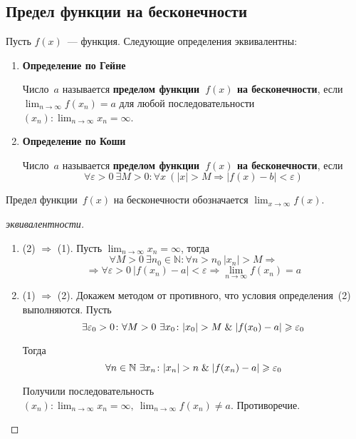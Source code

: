 \subsection{Предел функции на бесконечности}
Пусть $f(x)$~--- функция.
Следующие определения эквивалентны:
\begin{enumerate}
	\item \textbf{Определение по Гейне}
	
	Число~$a$ называется \textbf{пределом функции~$f(x)$ на бесконечности}, если $\displaystyle \lim_{n \to \infty} f(x_n) = a$ для любой последовательности~$\displaystyle (x_n) \colon \lim_{n \to \infty} x_n = \infty$.
	
	\item \textbf{Определение по Коши}
	
	Число~$a$ называется \textbf{пределом функции~$f(x)$ на бесконечности}, если
	\begin{equation*}
	\forall \varepsilon > 0 \ \exists M > 0 \colon \forall x \ (|x| > M \Rightarrow |f(x) - b| < \varepsilon)
	\end{equation*}
\end{enumerate}

Предел функции~$f(x)$ на бесконечности обозначается $\displaystyle \lim_{x \to \infty} f(x)$.
\begin{proof}[эквивалентности]
\begin{enumerate}
	\item (2) $\Rightarrow$ (1).
	Пусть $\displaystyle \lim_{n \to \infty} x_n = \infty$, тогда
	\begin{equation*}
	\forall M > 0 \ \exists n_0 \in \mathbb N \colon \forall n > n_0 \ |x_n| > M \Rightarrow
	\end{equation*}
	\begin{equation*}
	\Rightarrow \forall \varepsilon > 0 \ |f(x_n) - a| < \varepsilon \Rightarrow
	\lim_{n \to \infty} f(x_n) = a
	\end{equation*}
	
	\item (1) $\Rightarrow$ (2).
	Докажем методом от противного, что условия определения~(2) выполняются.
	Пусть
	\begin{equation*}
	\exists \varepsilon_0 > 0 \colon \forall M > 0 \ \exists x_0 \colon |x_0| > M \mathrel{\&} |f(x_0) - a| \geqslant \varepsilon_0
	\end{equation*}
	
	Тогда
	\begin{equation*}
	\forall n \in \mathbb N \ \exists x_n \colon |x_n| > n \mathrel{\&} |f(x_n) - a| \geqslant \varepsilon_0
	\end{equation*}
	
	Получили последовательность $\displaystyle (x_n) \colon \lim_{n \to \infty} x_n = \infty, \ \lim_{n \to \infty} f(x_n) \neq a$.
	Противоречие.
\end{enumerate}
\end{proof}

